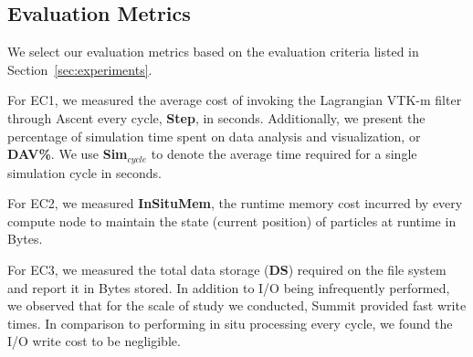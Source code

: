 %


\vspace{-1mm}
\subsection{Evaluation Metrics}
\label{sec:metrics}
We select our evaluation metrics based on the evaluation criteria listed in Section~\ref{sec:experiments}.
%

For EC1, we measured the average cost of invoking the Lagrangian VTK-m filter through Ascent every cycle, \textbf{Step}, in seconds. Additionally, we present the percentage of simulation time spent on data analysis and visualization, or \textbf{DAV\%}.
%
We use \textbf{Sim$_{cycle}$} to denote the average time required for a single simulation cycle in seconds.

For EC2, we measured \textbf{InSituMem}, the runtime memory cost incurred by every compute node to maintain the state (current position) of particles at runtime in Bytes.
%

For EC3, we measured the total data storage (\textbf{DS}) required on the file system and report it in Bytes stored.
%
%
In addition to I/O being infrequently performed, we observed that for the scale of study we conducted, Summit provided fast write times.
%
In comparison to performing in situ processing every cycle, we found the I/O write cost to be negligible. %

